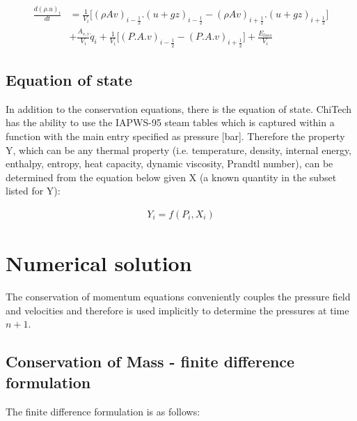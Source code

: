 \documentclass[11pt,letterpaper,titlepage]{article}
\newcommand{\half}{\frac{1}{2}}
\begin{document}
\begin{equation}
\begin{aligned}
\frac{d(\rho.u)_i}{dt} &=\frac{1}{V_i}\biggr[ (\rho Av)_{i-\half}.(u+gz)_{i-\half} - (\rho Av)_{i+\half}.(u+gz)_{i+\half} \biggr] \\
&+\frac{A_{s,i}}{V_i}\dot{q}_i + \frac{1}{V_i}\biggr[   (P.A.v)_{i-\half} - (P.A.v)_{i+\half}   \biggr] + \frac{E_{loss}}{V_i}
\end{aligned}
\end{equation}



\subsection{Equation of state}
In addition to the conservation equations, there is the equation of state. ChiTech has the ability to use the IAPWS-95 steam tables which is captured within
a function with the main entry specified as pressure [bar]. Therefore the property Y, which can be any thermal property (i.e. temperature, density, 
internal energy, enthalpy, entropy, heat capacity, dynamic viscosity, Prandtl number), can be determined from the equation below given X (a known quantity in the subset listed for Y):

\begin{equation}
\begin{aligned}
Y_i=f(P_i,X_i)
\end{aligned}
\end{equation}


















\newpage
{}
\section{Numerical solution}
The conservation of momentum equations conveniently couples the pressure field and velocities and therefore is used implicitly to determine the pressures at time $n+1$.

\subsection{Conservation of Mass - finite difference formulation}
The finite difference formulation is as follows:
\end{document}
